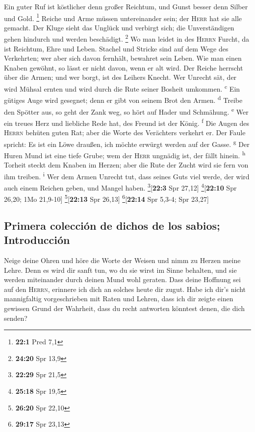  Ein guter Ruf ist köstlicher denn großer Reichtum, und
Gunst besser denn Silber und Gold. \footnote{\textbf{22:1} Pred 7,1}
 Reiche und Arme müssen untereinander sein; der
\textsc{Herr} hat sie alle gemacht.  Der Kluge sieht das
Unglück und verbirgt sich; die Unverständigen gehen hindurch und werden
beschädigt. \footnote{\textbf{24:20} Spr 13,9}  Wo man
leidet in des \textsc{Herrn} Furcht, da ist Reichtum, Ehre und Leben.
 Stachel und Stricke sind auf dem Wege des Verkehrten; wer
aber sich davon fernhält, bewahret sein Leben.  Wie man
einen Knaben gewöhnt, so lässt er nicht davon, wenn er alt wird.
 Der Reiche herrscht über die Armen; und wer borgt, ist
des Leihers Knecht.  Wer Unrecht sät, der wird Mühsal
ernten und wird durch die Rute seiner Bosheit umkommen.
\textsuperscript{c}  Ein gütiges Auge wird gesegnet; denn
er gibt von seinem Brot den Armen. \textsuperscript{d} 
Treibe den Spötter aus, so geht der Zank weg, so hört auf Hader und
Schmähung. \textsuperscript{e}  Wer ein treues Herz und
liebliche Rede hat, des Freund ist der König. \textsuperscript{f}
 Die Augen des \textsc{Herrn} behüten guten Rat; aber die
Worte des Verächters verkehrt er.  Der Faule spricht: Es
ist ein Löwe draußen, ich möchte erwürgt werden auf der Gasse.
\textsuperscript{g}  Der Huren Mund ist eine tiefe Grube;
wem der \textsc{Herr} ungnädig ist, der fällt hinein.
\textsuperscript{h}  Torheit steckt dem Knaben im Herzen;
aber die Rute der Zucht wird sie fern von ihm treiben.
\textsuperscript{i}  Wer dem Armen Unrecht tut, dass
seines Guts viel werde, der wird auch einem Reichen geben, und Mangel
haben. \footnote{\textbf{22:29} Spr 21,5}{[}\textbf{22:3} Spr 27,12{]}
\footnote{\textbf{25:18} Spr 19,5}{[}\textbf{22:10} Spr 26,20; 1Mo
21,9-10{]} \footnote{\textbf{26:20} Spr 22,10}{[}\textbf{22:13} Spr
26,13{]} \footnote{\textbf{29:17} Spr 23,13}{[}\textbf{22:14} Spr 5,3-4;
Spr 23,27{]}

\hypertarget{primera-colecciuxf3n-de-dichos-de-los-sabios-introducciuxf3n}{%
\subsection{Primera colección de dichos de los sabios;
Introducción}\label{primera-colecciuxf3n-de-dichos-de-los-sabios-introducciuxf3n}}

 Neige deine Ohren und höre die Worte der Weisen und nimm
zu Herzen meine Lehre.  Denn es wird dir sanft tun, wo du
sie wirst im Sinne behalten, und sie werden miteinander durch deinen
Mund wohl geraten.  Dass deine Hoffnung sei auf den
\textsc{Herrn}, erinnere ich dich an solches heute dir zugut.
 Habe ich dir's nicht mannigfaltig vorgeschrieben mit
Raten und Lehren,  dass ich dir zeigte einen gewissen
Grund der Wahrheit, dass du recht antworten könntest denen, die dich
senden?

